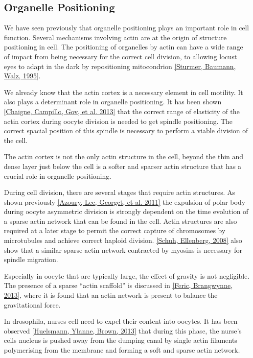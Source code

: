 \documentclass[A4paperpaper,11pt,english]{sphinxmanual}
\begin{document}
\subsection{Organelle Positioning}
\label{parts/part1:organelle-positioning}\label{parts/part1:id40}
We have seen previously that organelle positioning plays an important role in
cell function.  Several mechanisms involving actin are at the origin of
structure positioning in cell. The positioning of organelles by actin  can have
a wide range of impact from being necessary for the correct cell division, to
allowing locust eyes to adapt in the dark by repositioning mitocondrion
{\hyperref[parts/part1:sturmer1995]{{[}Sturmer, Baumann, Walz,  1995{]}}}.

We already know that the actin cortex is a necessary element in cell
motility. It also plays a determinant  role in organelle
positioning. It has been shown  {\hyperref[parts/part1:chaigne2013a]{{[}Chaigne, Campillo, Gov,  et al.  2013{]}}} that the correct range
of elasticity of the actin cortex during oocyte division is needed to get spindle
positioning. The correct spacial position of this spindle is necessary to
perform a viable division of the cell.

The actin cortex is not the only actin structure in the cell, beyond the thin and dense layer just below the cell is a softer and sparser actin structure that has a crucial role in organelle positioning.

During cell division, there are several stages that require actin structures.
As shown previously {\hyperref[parts/part1:azoury2011]{{[}Azoury, Lee, Georget,  et al.  2011{]}}} the expulsion of polar body during
oocyte asymmetric division is  strongly dependent on the time evolution of a
sparse actin network that can be found in the cell. Actin structures are  also
required at a later stage to permit the correct capture of chromosomes by
microtubules and achieve correct haploid division.  {\hyperref[parts/part1:schuh2008]{{[}Schuh, Ellenberg,  2008{]}}} also show
that a similar sparse actin network contracted by myosins is necessary for
spindle migration.

Especially in oocyte that are typically large, the effect of gravity is not
negligible. The presence of a sparse ``actin scaffold'' is discussed in
{\hyperref[parts/part1:feric2013]{{[}Feric, Brangwynne,  2013{]}}}, where it is found that an actin network is present to
balance the gravitational force.

In drosophila, nurses cell need to expel their content into oocytes. It has been
observed {\hyperref[parts/part1:huelsmann2013]{{[}Huelsmann, Ylanne, Brown,  2013{]}}} that during this phase, the nurse's cells nucleus
is pushed away from the dumping canal by single actin filaments polymerising
from the membrane and forming a soft and sparse actin network.
\end{document}
